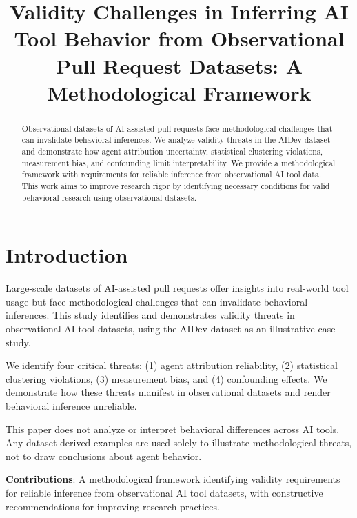 \documentclass[conference]{IEEEtran}
\begin{document}
\title{Validity Challenges in Inferring AI Tool Behavior from Observational Pull Request Datasets: A Methodological Framework}

\author{
}

\maketitle

\begin{abstract}
Observational datasets of AI-assisted pull requests face methodological challenges that can invalidate behavioral inferences. We analyze validity threats in the AIDev dataset and demonstrate how agent attribution uncertainty, statistical clustering violations, measurement bias, and confounding limit interpretability. We provide a methodological framework with requirements for reliable inference from observational AI tool data. This work aims to improve research rigor by identifying necessary conditions for valid behavioral research using observational datasets.
\end{abstract}

\section{Introduction}

Large-scale datasets of AI-assisted pull requests offer insights into real-world tool usage but face methodological challenges that can invalidate behavioral inferences. This study identifies and demonstrates validity threats in observational AI tool datasets, using the AIDev dataset as an illustrative case study.

We identify four critical threats: (1) agent attribution reliability, (2) statistical clustering violations, (3) measurement bias, and (4) confounding effects. We demonstrate how these threats manifest in observational datasets and render behavioral inference unreliable.

This paper does not analyze or interpret behavioral differences across AI tools. Any dataset-derived examples are used solely to illustrate methodological threats, not to draw conclusions about agent behavior.

\textbf{Contributions}: A methodological framework identifying validity requirements for reliable inference from observational AI tool datasets, with constructive recommendations for improving research practices.
\end{document}
